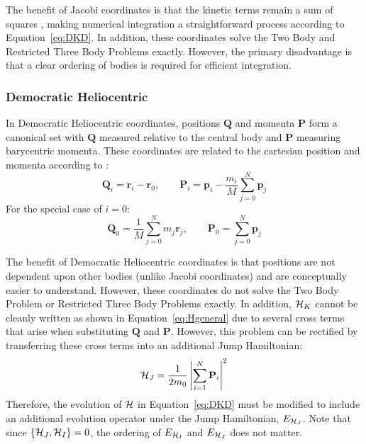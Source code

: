 The benefit of Jacobi coordinates is that the kinetic terms remain a sum of squares \citep{Plummer1918}, making numerical integration a straightforward process according to Equation~\ref{eq:DKD}. 
In addition, these coordinates solve the Two Body and Restricted Three Body Problems exactly. 
However, the primary disadvantage is that a clear ordering of bodies is required for efficient integration.

\subsubsection{Democratic Heliocentric}
\label{sec:DH}
In Democratic Heliocentric coordinates, positions $\textbf{Q}$ and momenta $\textbf{P}$ form a canonical set with $\textbf{Q}$ measured relative to the central body and $\textbf{P}$ measuring barycentric momenta.
These coordinates are related to the cartesian position and momenta according to \citep{Duncan1998}:
\begin{equation}
\textbf{Q}_i = \textbf{r}_i - \textbf{r}_0, \qquad
\textbf{P}_i = \textbf{p}_i - \frac{m_i}{M}\sum_{j=0}^N \textbf{p}_j
\end{equation}
For the special case of $i=0$:
\begin{equation}
\textbf{Q}_0 = \frac{1}{M} \sum_{j=0}^N m_j \textbf{r}_j, \qquad
\textbf{P}_0 = \sum_{j=0}^{N} \textbf{p}_j
\end{equation}

The benefit of Democratic Heliocentric coordinates is that positions are not dependent upon other bodies (unlike Jacobi coordinates) and are conceptually easier to understand. 
However, these coordinates do not solve the Two Body Problem or Restricted Three Body Problems exactly. 
In addition, $\mathcal{H}_K$ cannot be cleanly written as shown in Equation~\ref{eq:Hgeneral} due to several cross terms that arise when substituting $\textbf{Q}$ and \textbf{P}.
However, this problem can be rectified by transferring these cross terms into an additional Jump Hamiltonian:
\begin{equation}
\mathcal{H}_J = \frac{1}{2m_0} \left|\sum_{i=1}^N \textbf{P}_i\right|^2
\end{equation}
Therefore, the evolution of $\mathcal{H}$ in Equation~\ref{eq:DKD} must be modified to include an additional evolution operator under the Jump Hamiltonian, $E_{\mathcal{H}_J}$.
Note that since $\{\mathcal{H}_J, \mathcal{H}_I\} = 0$, the ordering of $E_{\mathcal{H}_I}$ and $E_{\mathcal{H}_J}$ does not matter. 

